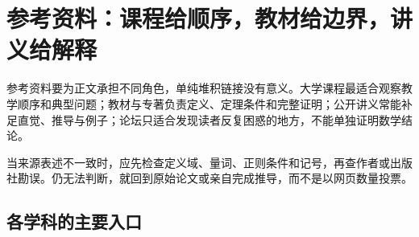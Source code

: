 \section{参考资料：课程给顺序，教材给边界，讲义给解释}

参考资料要为正文承担不同角色，单纯堆积链接没有意义。大学课程最适合观察教学顺序和典型问题；教材与专著负责定义、定理条件和完整证明；公开讲义常能补足直觉、推导与例子；论坛只适合发现读者反复困惑的地方，不能单独证明数学结论。

当来源表述不一致时，应先检查定义域、量词、正则条件和记号，再查作者或出版社勘误。仍无法判断，就回到原始论文或亲自完成推导，而不是以网页数量投票。

\subsection{各学科的主要入口}

